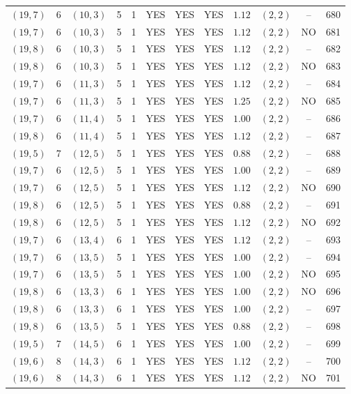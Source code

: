 \begin{longtable}{|c|c|c|c|c|c|c|c|c|c|c|c|}
$(19,7)$ & 6 & $(10,3)$ & 5 & 1 & YES & YES & YES & $1.12$ & $(2,2)$ & -- & 680\\
$(19,7)$ & 6 & $(10,3)$ & 5 & 1 & YES & YES & YES & $1.12$ & $(2,2)$ & NO & 681\\
$(19,8)$ & 6 & $(10,3)$ & 5 & 1 & YES & YES & YES & $1.12$ & $(2,2)$ & -- & 682\\
$(19,8)$ & 6 & $(10,3)$ & 5 & 1 & YES & YES & YES & $1.12$ & $(2,2)$ & NO & 683\\
$(19,7)$ & 6 & $(11,3)$ & 5 & 1 & YES & YES & YES & $1.12$ & $(2,2)$ & -- & 684\\
$(19,7)$ & 6 & $(11,3)$ & 5 & 1 & YES & YES & YES & $1.25$ & $(2,2)$ & NO & 685\\
$(19,7)$ & 6 & $(11,4)$ & 5 & 1 & YES & YES & YES & $1.00$ & $(2,2)$ & -- & 686\\
$(19,8)$ & 6 & $(11,4)$ & 5 & 1 & YES & YES & YES & $1.12$ & $(2,2)$ & -- & 687\\
$(19,5)$ & 7 & $(12,5)$ & 5 & 1 & YES & YES & YES & $0.88$ & $(2,2)$ & -- & 688\\
$(19,7)$ & 6 & $(12,5)$ & 5 & 1 & YES & YES & YES & $1.00$ & $(2,2)$ & -- & 689\\
$(19,7)$ & 6 & $(12,5)$ & 5 & 1 & YES & YES & YES & $1.12$ & $(2,2)$ & NO & 690\\
$(19,8)$ & 6 & $(12,5)$ & 5 & 1 & YES & YES & YES & $0.88$ & $(2,2)$ & -- & 691\\
$(19,8)$ & 6 & $(12,5)$ & 5 & 1 & YES & YES & YES & $1.12$ & $(2,2)$ & NO & 692\\
$(19,7)$ & 6 & $(13,4)$ & 6 & 1 & YES & YES & YES & $1.12$ & $(2,2)$ & -- & 693\\
$(19,7)$ & 6 & $(13,5)$ & 5 & 1 & YES & YES & YES & $1.00$ & $(2,2)$ & -- & 694\\
$(19,7)$ & 6 & $(13,5)$ & 5 & 1 & YES & YES & YES & $1.00$ & $(2,2)$ & NO & 695\\
$(19,8)$ & 6 & $(13,3)$ & 6 & 1 & YES & YES & YES & $1.00$ & $(2,2)$ & NO & 696\\
$(19,8)$ & 6 & $(13,3)$ & 6 & 1 & YES & YES & YES & $1.00$ & $(2,2)$ & -- & 697\\
$(19,8)$ & 6 & $(13,5)$ & 5 & 1 & YES & YES & YES & $0.88$ & $(2,2)$ & -- & 698\\
$(19,5)$ & 7 & $(14,5)$ & 6 & 1 & YES & YES & YES & $1.00$ & $(2,2)$ & -- & 699\\
$(19,6)$ & 8 & $(14,3)$ & 6 & 1 & YES & YES & YES & $1.12$ & $(2,2)$ & -- & 700\\
$(19,6)$ & 8 & $(14,3)$ & 6 & 1 & YES & YES & YES & $1.12$ & $(2,2)$ & NO & 701\\

\end{longtable}
